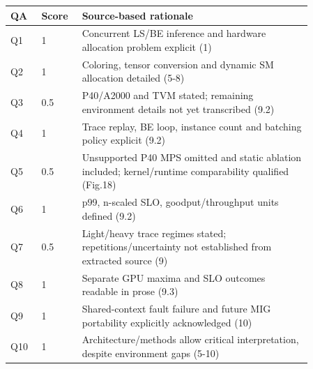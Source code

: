 \begin{longtable}{P{0.09\linewidth}P{0.10\linewidth}P{0.67\linewidth}}
\toprule QA & Score & Source-based rationale\\\midrule\endhead
Q1 & 1 & Concurrent LS/BE inference and hardware allocation problem explicit (1)\\
Q2 & 1 & Coloring, tensor conversion and dynamic SM allocation detailed (5-8)\\
Q3 & 0.5 & P40/A2000 and TVM stated; remaining environment details not yet transcribed (9.2)\\
Q4 & 1 & Trace replay, BE loop, instance count and batching policy explicit (9.2)\\
Q5 & 0.5 & Unsupported P40 MPS omitted and static ablation included; kernel/runtime comparability qualified (Fig.18)\\
Q6 & 1 & p99, n-scaled SLO, goodput/throughput units defined (9.2)\\
Q7 & 0.5 & Light/heavy trace regimes stated; repetitions/uncertainty not established from extracted source (9)\\
Q8 & 1 & Separate GPU maxima and SLO outcomes readable in prose (9.3)\\
Q9 & 1 & Shared-context fault failure and future MIG portability explicitly acknowledged (10)\\
Q10 & 1 & Architecture/methods allow critical interpretation, despite environment gaps (5-10)\\
\bottomrule\end{longtable}

